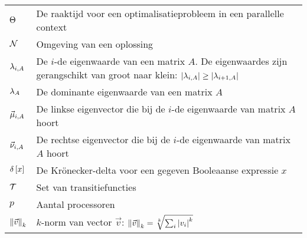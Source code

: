 \begin{flushleft}
\begin{tabularx}{\textwidth}{@{}p{18mm}X@{}}
    $\phittime$					& De raaktijd voor een optimalisatieprobleem in een parallelle context\\
    $\neighbr$					& Omgeving van een oplossing\\
    $\ev[i,A]$					& De $i$-de eigenwaarde van een matrix $A$. De eigenwaardes zijn gerangschikt van groot naar klein: $\abs{\ev[i,A]}\geq\abs{\ev[i+1,A]}$\\
    $\ev[A]$					& De dominante eigenwaarde van een matrix $A$\\
    $\evl[i,A]$					& De linkse eigenvector die bij de $i$-de eigenwaarde van matrix $A$ hoort\\
    $\evr[i,A]$					& De rechtse eigenvector die bij de $i$-de eigenwaarde van matrix $A$ hoort\\
    $\krdelta{x}$				& De Kr\"onecker-delta voor een gegeven Booleaanse expressie $x$\\
    $\TranSet$					& Set van transitiefuncties\\
    $p$							& Aantal processoren\\
    $\dabs[k]{\vec{v}}$			& $k$-norm van vector $\vec{v}$: $\dabs[k]{\vec{v}}=\sqrt[k]{\sum_i\abs{v_i}^k}$
  \end{tabularx}
\end{flushleft}